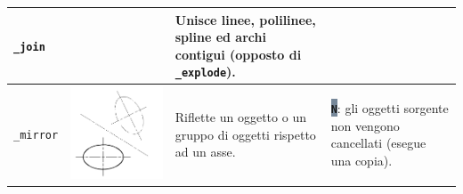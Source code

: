 \documentclass[..]{../IEEEphot}
\newcommand{\param}[1]{\colorbox{LightSlateGray}{\color{Navy}\texttt{\textbf{#1}}}}
\begin{document}
\begin{center}
\begin{longtable}{m{.2\linewidth}m{.2\linewidth}m{.25\linewidth}m{.25\linewidth}}
\\
\midrule
\texttt{\_join} & & Unisce linee, polilinee, spline ed archi contigui (opposto di \texttt{\_explode}). & 
\\
\midrule
\texttt{\_mirror} & \includegraphics[width = 0.8\linewidth, keepaspectratio]{../images/jpg/_mirror.jpg} & Riflette un oggetto o un gruppo di oggetti rispetto ad un asse. & 
\param{N}: gli oggetti sorgente non vengono cancellati (esegue una copia).


\end{longtable}
\end{center}
\end{document}
